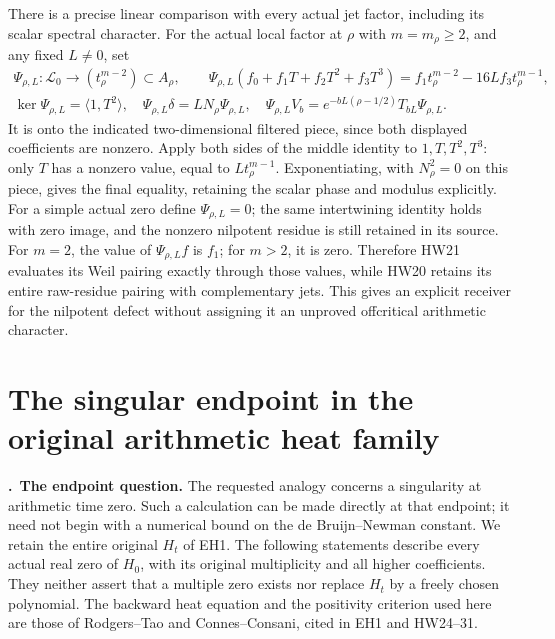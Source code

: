 \documentclass[11pt,a4paper]{article}
\theoremstyle{definition}\newtheorem{definition}[theorem]{Definition}
\begin{document}
There is a precise linear comparison with every actual
jet factor, including its scalar spectral character.
For the actual local factor at \(\rho\) with \(m=m_\rho\ge2\),
and any fixed \(L\ne0\), set
\[
 \begin{gathered}
 \Psi_{\rho,L}:\mathscr L_0\longrightarrow
                 (t_\rho^{m-2})\subset A_\rho,\qquad
 \Psi_{\rho,L}(f_0+f_1T+f_2T^2+f_3T^3)
       =f_1t_\rho^{m-2}-16L f_3t_\rho^{m-1},\\
 \ker\Psi_{\rho,L}=\langle1,T^2\rangle,\quad
 \Psi_{\rho,L}\delta=L N_\rho\Psi_{\rho,L},\quad
 \Psi_{\rho,L}V_b=
   e^{-bL(\rho-1/2)}T_{bL}\Psi_{\rho,L}.
 \end{gathered}
 \tag{HW64}\label{hw:residuejet}
\]
It is onto the indicated two-dimensional filtered piece,
since both displayed coefficients are nonzero. Apply both
sides of the middle identity to \(1,T,T^2,T^3\): only
\(T\) has a nonzero value, equal to \(L t_\rho^{m-1}\).
Exponentiating, with \(N_\rho^2=0\) on this piece,
gives the final equality, retaining the scalar phase and
modulus explicitly. For a simple actual zero define
\(\Psi_{\rho,L}=0\); the same intertwining identity holds
with zero image, and the nonzero nilpotent residue is
still retained in its source.
For \(m=2\), the value of \(\Psi_{\rho,L}f\) is \(f_1\);
for \(m>2\), it is zero. Therefore HW21 evaluates its
Weil pairing exactly through those values, while HW20
retains its entire raw-residue pairing with complementary
jets. This gives an explicit receiver for the nilpotent
defect without assigning it an unproved offcritical
arithmetic character.



\endgroup

\section{The singular endpoint in the original arithmetic heat family}
\label{sec:ep}
\newcommand{\EP}{\par\medskip\noindent\textbf{\theep.}\ }

\EP\textbf{The endpoint question.}
The requested analogy concerns a singularity at arithmetic time zero.
Such a calculation can be made directly at that endpoint; it need not
begin with a numerical bound on the de Bruijn--Newman constant.
We retain the entire original $H_t$ of EH1. The following statements
describe every actual real zero of $H_0$, with its original multiplicity
and all higher coefficients. They neither assert that a multiple zero
exists nor replace $H_t$ by a freely chosen polynomial.
The backward heat equation and the positivity criterion used here are
those of Rodgers--Tao and Connes--Consani, cited in EH1 and HW24--31.
\end{document}
